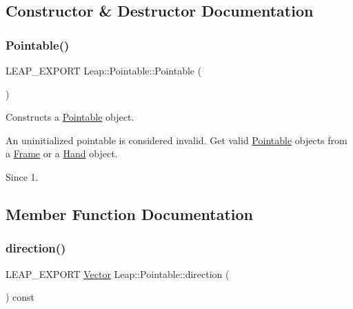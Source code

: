 \subsection{Constructor \& Destructor Documentation}
\mbox{\label{class_leap_1_1_pointable_a5b42d880b673daa25c938d9fcf8d93eb}} 
\subsubsection{\texorpdfstring{Pointable()}{Pointable()}}
{\footnotesize\ttfamily L\+E\+A\+P\+\_\+\+E\+X\+P\+O\+RT Leap\+::\+Pointable\+::\+Pointable (\begin{DoxyParamCaption}{ }\end{DoxyParamCaption})}

Constructs a \hyperlink{class_leap_1_1_pointable}{Pointable} object.

An uninitialized pointable is considered invalid. Get valid \hyperlink{class_leap_1_1_pointable}{Pointable} objects from a \hyperlink{class_leap_1_1_frame}{Frame} or a \hyperlink{class_leap_1_1_hand}{Hand} object.


\begin{DoxyCodeInclude}
\end{DoxyCodeInclude}


\begin{DoxySince}{Since}
1. 
\end{DoxySince}


\subsection{Member Function Documentation}
\mbox{\label{class_leap_1_1_pointable_ada6f5dd7959f4bc437667065cd18e03e}} 
\subsubsection{\texorpdfstring{direction()}{direction()}}
{\footnotesize\ttfamily L\+E\+A\+P\+\_\+\+E\+X\+P\+O\+RT \hyperlink{struct_leap_1_1_vector}{Vector} Leap\+::\+Pointable\+::direction (\begin{DoxyParamCaption}{ }\end{DoxyParamCaption}) const}


